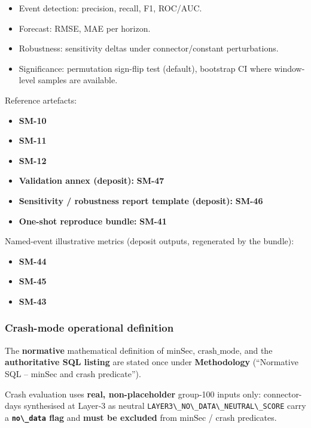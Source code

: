\documentclass[
  11pt,
  peerreview,journal,onecolumn]{IEEEtran}
\newcommand{\passthrough}[1]{#1}
\providecommand{\tightlist}{%
  \setlength{\itemsep}{0pt}\setlength{\parskip}{0pt}}
\begin{document}
\begin{itemize}
\tightlist
\item
  Event detection: precision, recall, F1, ROC/AUC.
\item
  Forecast: RMSE, MAE per horizon.
\item
  Robustness: sensitivity deltas under connector/constant perturbations.
\item
  Significance: permutation sign-flip test (default), bootstrap CI where
  window-level samples are available.
\end{itemize}

Reference artefacts:

\begin{itemize}
\tightlist
\item
  \textbf{SM-10}
\item
  \textbf{SM-11}
\item
  \textbf{SM-12}
\item
  \textbf{Validation annex (deposit):} \textbf{SM-47}
\item
  \textbf{Sensitivity / robustness report template (deposit):}
  \textbf{SM-46}
\item
  \textbf{One-shot reproduce bundle:} \textbf{SM-41}
\end{itemize}

Named-event illustrative metrics (deposit outputs, regenerated by the
bundle):

\begin{itemize}
\tightlist
\item
  \textbf{SM-44}
\item
  \textbf{SM-45}
\item
  \textbf{SM-43}
\end{itemize}

\hypertarget{crash-mode-operational-definition}{%
\subsubsection{Crash-mode operational
definition}\label{crash-mode-operational-definition}}

The \textbf{normative} mathematical definition of \(\mathrm{minSec}\),
\(\mathrm{crash\_mode}\), and the \textbf{authoritative SQL listing} are
stated once under \textbf{Methodology} (``Normative SQL --
\(\mathrm{minSec}\) and crash predicate'').

Crash evaluation uses \textbf{real, non-placeholder} group-100 inputs
only: connector-days synthesised at Layer‑3 as neutral
\passthrough{\lstinline!LAYER3\_NO\_DATA\_NEUTRAL\_SCORE!} carry a
\textbf{\passthrough{\lstinline!no\_data!} flag} and \textbf{must be
excluded} from \(\mathrm{minSec}\) / crash predicates.
\end{document}
